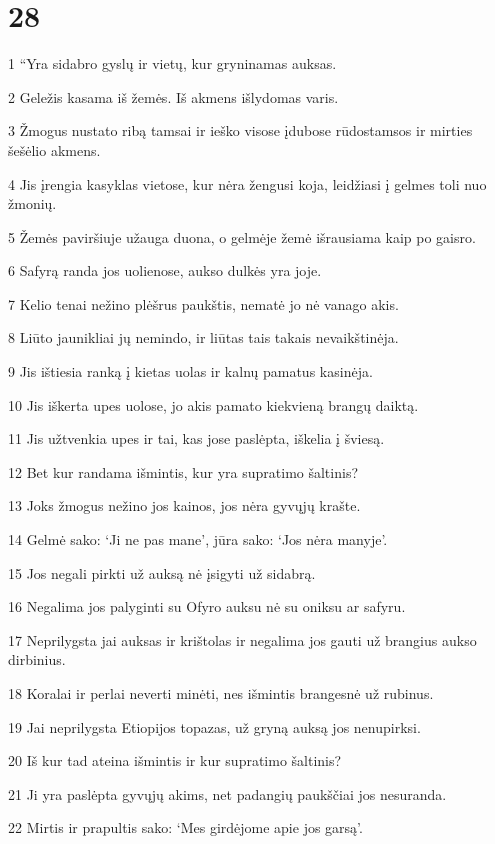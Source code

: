 \chapter{28}


\par 1 “Yra sidabro gyslų ir vietų, kur gryninamas auksas. 
\par 2 Geležis kasama iš žemės. Iš akmens išlydomas varis. 
\par 3 Žmogus nustato ribą tamsai ir ieško visose įdubose rūdos­tamsos ir mirties šešėlio akmens. 
\par 4 Jis įrengia kasyklas vietose, kur nėra žengusi koja, leidžiasi į gelmes toli nuo žmonių. 
\par 5 Žemės paviršiuje užauga duona, o gelmėje žemė išrausiama kaip po gaisro. 
\par 6 Safyrą randa jos uolienose, aukso dulkės yra joje. 
\par 7 Kelio tenai nežino plėšrus paukštis, nematė jo nė vanago akis. 
\par 8 Liūto jaunikliai jų nemindo, ir liūtas tais takais nevaikštinėja. 
\par 9 Jis ištiesia ranką į kietas uolas ir kalnų pamatus kasinėja. 
\par 10 Jis iškerta upes uolose, jo akis pamato kiekvieną brangų daiktą. 
\par 11 Jis užtvenkia upes ir tai, kas jose paslėpta, iškelia į šviesą. 
\par 12 Bet kur randama išmintis, kur yra supratimo šaltinis? 
\par 13 Joks žmogus nežino jos kainos, jos nėra gyvųjų krašte. 
\par 14 Gelmė sako: ‘Ji ne pas mane’, jūra sako: ‘Jos nėra manyje’. 
\par 15 Jos negali pirkti už auksą nė įsigyti už sidabrą. 
\par 16 Negalima jos palyginti su Ofyro auksu nė su oniksu ar safyru. 
\par 17 Neprilygsta jai auksas ir krištolas ir negalima jos gauti už brangius aukso dirbinius. 
\par 18 Koralai ir perlai neverti minėti, nes išmintis brangesnė už rubinus. 
\par 19 Jai neprilygsta Etiopijos topazas, už gryną auksą jos nenupirksi. 
\par 20 Iš kur tad ateina išmintis ir kur supratimo šaltinis? 
\par 21 Ji yra paslėpta gyvųjų akims, net padangių paukščiai jos nesuranda. 
\par 22 Mirtis ir prapultis sako: ‘Mes girdėjome apie jos garsą’. 
